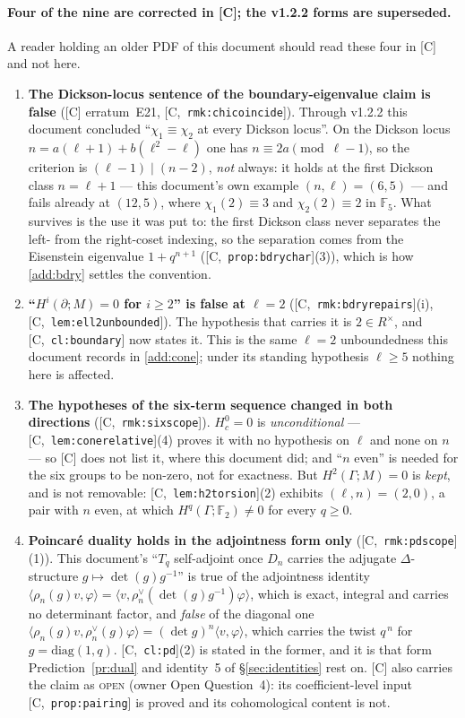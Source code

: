 \documentclass[11pt]{article}
\theoremstyle{remark}
\newcommand{\F}{\mathbb{F}}
\newcommand{\Ga}{\Gamma}
\newcommand{\De}{\Delta}
\newcommand{\Dn}{D_n}
\newcommand{\HA}[1]{[C,~\texttt{#1}]}      %
\begin{document}
\paragraph{Four of the nine are corrected in [C]; the v1.2.2 forms are superseded.}
A reader holding an older PDF of this document should read these four in [C] and not here.
\begin{enumerate}
\item \textbf{The Dickson-locus sentence of the boundary-eigenvalue claim is false}
  ([C] erratum~E21, \HA{rmk:chicoincide}). Through v1.2.2 this document concluded
  ``$\chi_1\equiv\chi_2$ at every Dickson locus''. On the Dickson locus
  $n=a(\ell+1)+b(\ell^2-\ell)$ one has $n\equiv2a\pmod{\ell-1}$, so the criterion is
  $(\ell-1)\mid(n-2)$, \emph{not} always: it holds at the first Dickson class $n=\ell+1$ ---
  this document's own example $(n,\ell)=(6,5)$ --- and fails already at $(12,5)$, where
  $\chi_1(2)\equiv3$ and $\chi_2(2)\equiv2$ in $\F_5$. What survives is the use it was put to:
  the first Dickson class never separates the left- from the right-coset indexing, so the
  separation comes from the Eisenstein eigenvalue $1+q^{n+1}$ (\HA{prop:bdrychar}(3)), which
  is how \ref{add:bdry} settles the convention.
\item \textbf{``$H^i(\partial;M)=0$ for $i\ge2$'' is false at $\ell=2$}
  (\HA{rmk:bdryrepairs}(i), \HA{lem:ell2unbounded}). The hypothesis that carries it is
  $2\in R^\times$, and \HA{cl:boundary} now states it. This is the same $\ell=2$ unboundedness
  this document records in \ref{add:cone}; under its standing hypothesis $\ell\ge5$ nothing here is
  affected.
\item \textbf{The hypotheses of the six-term sequence changed in both directions}
  (\HA{rmk:sixscope}). $H^0_c=0$ is \emph{unconditional} --- \HA{lem:conerelative}(4) proves
  it with no hypothesis on $\ell$ and none on $n$ --- so [C] does not list it, where this
  document did; and ``$n$ even'' is needed for the six groups to be non-zero, not for
  exactness. But $H^2(\Ga;M)=0$ is \emph{kept}, and is not removable: \HA{lem:h2torsion}(2)
  exhibits $(\ell,n)=(2,0)$, a pair with $n$ even, at which $H^q(\Ga;\F_2)\ne0$ for every
  $q\ge0$.
\item \textbf{Poincar\'e duality holds in the adjointness form only} (\HA{rmk:pdscope}(1)).
  This document's ``$T_q$ self-adjoint once $\Dn$ carries the adjugate $\De$-structure
  $g\mapsto\det(g)g^{-1}$'' is true of the adjointness identity
  $\langle\rho_n(g)v,\varphi\rangle=\langle v,\rho_n^\vee(\det(g)g^{-1})\varphi\rangle$, which
  is exact, integral and carries no determinant factor, and \emph{false} of the diagonal one
  $\langle\rho_n(g)v,\rho_n^\vee(g)\varphi\rangle=(\det g)^n\langle v,\varphi\rangle$, which
  carries the twist $q^{\,n}$ for $g=\mathrm{diag}(1,q)$. \HA{cl:pd}(2) is stated in the
  former, and it is that form Prediction~\ref{pr:dual} and identity~5 of
  \S\ref{sec:identities} rest on. [C] also carries the claim as \textsc{open} (owner Open
  Question~4): its coefficient-level input \HA{prop:pairing} is proved and its cohomological
  content is not.
\end{enumerate}
\end{document}
